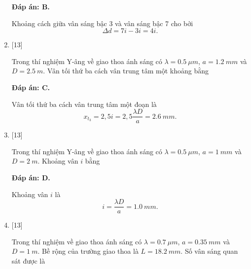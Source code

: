 \begin{enumerate}[label=\bfseries Câu \arabic*:]
	\loigiai
	{		\textbf{Đáp án: B.}
		
		Khoảng cách giữa vân sáng bậc 3 và vân sáng bậc 7 cho bởi
		$$
		\Delta d = 7i - 3i = 4i.
		$$
	}
	
	\item {} [13]
	\cauhoi
	{Trong thí nghiệm Y-âng về giao thoa ánh sáng có $\lambda = \SI{0,5}{\mu m}$, $a = \SI{1,2}{mm}$ và $D = \SI{2,5}{m}$. Vân tối thứ ba cách vân trung tâm một khoảng bằng
	}
	
	\loigiai
	{		\textbf{Đáp án: C.}
		
		Vân tối thứ ba cách vân trung tâm một đoạn là
		$$
		x_{t_{3}} = 2,5i = 2,5 \dfrac{\lambda D}{a} = \SI{2,6}{mm}.
		$$
	}
	
	\item {} [13]
	\cauhoi
	{Trong thí nghiệm Y-âng về giao thoa ánh sáng có $\lambda = \SI{0,5}{\mu m}$, $a = \SI{1}{mm}$ và $D = \SI{2}{m}$. Khoảng vân $i$ bằng
	}
	
	\loigiai
	{		\textbf{Đáp án: D.}
		
		Khoảng vân $i$ là
		$$
		i = \dfrac{\lambda D}{a} = \SI{1,0}{mm}.
		$$
	}
	
	\item {} [13]
	\cauhoi
	{Trong thí nghiệm về giao thoa ánh sáng có $\lambda = \SI{0,7}{\mu m}$, $a = \SI{0,35}{mm}$ và $D = \SI{1}{m}$. Bề rộng của trường giao thoa là $L = \SI{18,2}{mm}$. Số vân sáng quan sát được là
	}
	

\end{enumerate}
